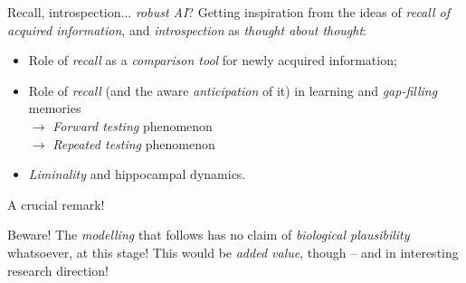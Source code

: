 {\begin{frame}{ Recall, introspection... \textit{robust AI}?}
        Getting inspiration from the ideas of  \textit{\alert{recall} of acquired information}, and \textit{\alert{introspection}} as \textit{thought about thought}:
        \begin{itemize}
            \item Role of \textit{recall} as a \textit{\alert{comparison} tool} for newly acquired information;
            \item Role of \textit{recall} (and the aware \textit{anticipation} of it) in learning and \textit{\alert{gap-filling}} memories\\
            $\rightarrow$ \textit{Forward testing} phenomenon\\
            $\rightarrow$ \textit{Repeated testing} phenomenon
            \item \textit{Liminality} and hippocampal dynamics.
        \end{itemize}
    \end{frame}


    \begin{frame}{ A crucial remark!}
        \begin{block}{ Beware!}
            The \textit{modelling} that follows has no claim of \textit{biological plausibility} whatsoever, at this stage! This would be \textit{added value}, though -- and in interesting research direction!
        \end{block}
    \end{frame}
}
